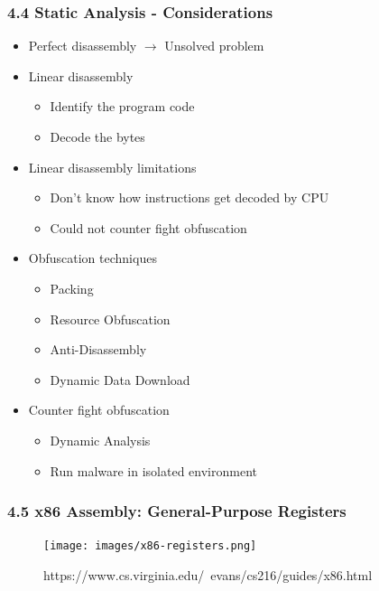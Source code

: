 \begin{frame}[fragile]
  \frametitle{4.4 Static Analysis - Considerations}
    \begin{itemize}
        \item Perfect disassembly $\to$ Unsolved problem
        \item Linear disassembly
        \begin{itemize}
            \item Identify the program code
            \item Decode the bytes
        \end{itemize}
        \item Linear disassembly limitations
        \begin{itemize}
            \item Don't know how instructions get decoded by CPU
            \item Could not counter fight obfuscation
        \end{itemize}
        \item Obfuscation techniques
        \begin{itemize}
            \item Packing
            \item Resource Obfuscation
            \item Anti-Disassembly
            \item Dynamic Data Download
        \end{itemize}
        \item Counter fight obfuscation
        \begin{itemize}
            \item Dynamic Analysis
            \item Run malware in isolated environment
        \end{itemize}
    \end{itemize}
\end{frame}


\begin{frame}[fragile]
  \frametitle{4.5 x86 Assembly: General-Purpose Registers}
    \begin{figure}
        \texttt{[image: images/x86-registers.png]}
        \captionsetup{labelformat=empty,labelsep=none}
        \caption[]{\tiny https://www.cs.virginia.edu/~evans/cs216/guides/x86.html}
    \end{figure}
\end{frame}


